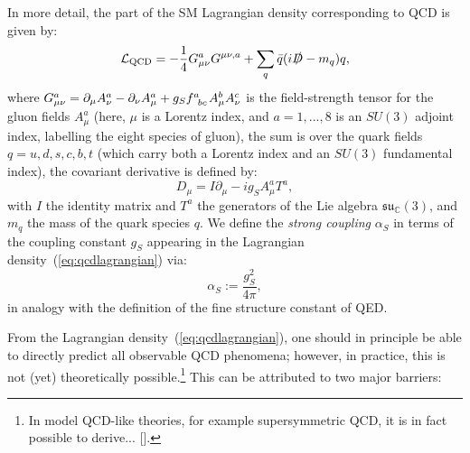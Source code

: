 \documentclass[withindex,glossary]{cam-thesis}
\begin{document}
In more detail, the part of the SM Lagrangian density corresponding to QCD is given by:
\begin{equation}
\label{eq:qcdlagrangian}
\mathcal{L}_{\text{QCD}} = -\frac{1}{4} G_{\mu\nu}^a G^{\mu\nu,a} + \sum_{q} \bar{q} (i \slashed{D} - m_q) q,
\end{equation}
where $G_{\mu\nu}^a = \partial_{\mu} A^a_{\nu} - \partial_{\nu} A^a_{\mu} + g_S \tensor{f}{^a_{bc}} A^b_{\mu} A^c_{\nu}$ is the field-strength tensor for the gluon fields $A^a_{\mu}$ (here, $\mu$ is a Lorentz index, and $a = 1,...,8$ is an $SU(3)$ adjoint index, labelling the eight species of gluon), the sum is over the quark fields $q = u, d, s, c, b, t$ (which carry both a Lorentz index and an $SU(3)$ fundamental index), the covariant derivative is defined by:
\begin{equation}
\label{eq:qcd_derivative}
D_{\mu} = I\partial_{\mu} - i g_S A_{\mu}^a T^a,
\end{equation}
with $I$ the identity matrix and $T^a$ the generators of the Lie algebra $\mathfrak{su}_{\mathbb{C}}(3)$, and $m_q$ the mass of the quark species $q$. We define the \textit{strong coupling} $\alpha_S$ in terms of the coupling constant $g_S$ appearing in the Lagrangian density~(\ref{eq:qcdlagrangian}) via:
\begin{equation}
\alpha_S := \frac{g_S^2}{4\pi},
\end{equation}
in analogy with the definition of the fine structure constant of QED. 

From the Lagrangian density~(\ref{eq:qcdlagrangian}), one should in principle be able to directly predict all observable QCD phenomena; however, in practice, this is not (yet) theoretically possible.\footnote{In model QCD-like theories, for example supersymmetric QCD, it is in fact possible to derive... [].} This can be attributed to two major barriers:
\end{document}
